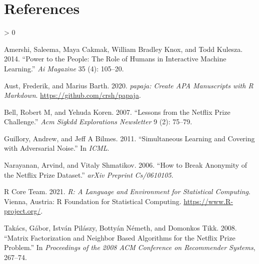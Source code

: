 \documentclass[
  man]{apa6}
\newlength{\cslhangindent}
\newenvironment{CSLReferences}[2] %
 {%
  \setlength{\parindent}{0pt}
  \ifodd #1 \everypar{\setlength{\hangindent}{\cslhangindent}}\ignorespaces\fi
  \ifnum #2 > 0
  \setlength{\parskip}{#2\baselineskip}
  \fi
 }%
 {}
\begin{document}
\newpage

\hypertarget{references}{%
\section{References}\label{references}}

\begingroup
\setlength{\parindent}{-0.5in}
\setlength{\leftskip}{0.5in}

\hypertarget{refs}{}
\begin{CSLReferences}{1}{0}
\leavevmode\hypertarget{ref-amershi2014power}{}%
Amershi, Saleema, Maya Cakmak, William Bradley Knox, and Todd Kulesza.
2014. {``Power to the People: The Role of Humans in Interactive Machine
Learning.''} \emph{Ai Magazine} 35 (4): 105--20.

\leavevmode\hypertarget{ref-R-papaja}{}%
Aust, Frederik, and Marius Barth. 2020. \emph{{papaja}: {Create} {APA}
Manuscripts with {R Markdown}}. \url{https://github.com/crsh/papaja}.

\leavevmode\hypertarget{ref-bell2007lessons}{}%
Bell, Robert M, and Yehuda Koren. 2007. {``Lessons from the Netflix
Prize Challenge.''} \emph{Acm Sigkdd Explorations Newsletter} 9 (2):
75--79.

\leavevmode\hypertarget{ref-guillory2011simultaneous}{}%
Guillory, Andrew, and Jeff A Bilmes. 2011. {``Simultaneous Learning and
Covering with Adversarial Noise.''} In \emph{ICML}.

\leavevmode\hypertarget{ref-narayanan2006break}{}%
Narayanan, Arvind, and Vitaly Shmatikov. 2006. {``How to Break Anonymity
of the Netflix Prize Dataset.''} \emph{arXiv Preprint Cs/0610105}.

\leavevmode\hypertarget{ref-R-base}{}%
R Core Team. 2021. \emph{R: A Language and Environment for Statistical
Computing}. Vienna, Austria: R Foundation for Statistical Computing.
\url{https://www.R-project.org/}.

\leavevmode\hypertarget{ref-takacs2008matrix}{}%
Takács, Gábor, István Pilászy, Bottyán Németh, and Domonkos Tikk. 2008.
{``Matrix Factorization and Neighbor Based Algorithms for the Netflix
Prize Problem.''} In \emph{Proceedings of the 2008 ACM Conference on
Recommender Systems}, 267--74.

\end{CSLReferences}

\endgroup
\end{document}
